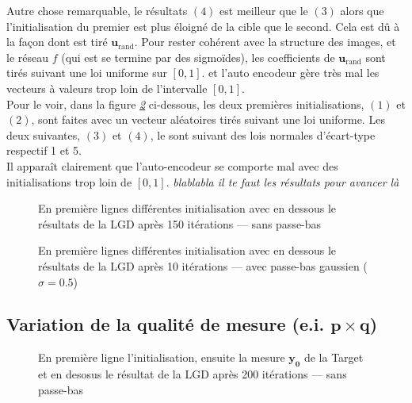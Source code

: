 \documentclass[hidelinks, french]{article} %
\renewcommand{\bf}[1]{\boldsymbol{#1}}
\theoremstyle{enonce}
\theoremstyle{special}
\theoremstyle{rq}
\theoremstyle{exo}
\theoremstyle{demo}
\begin{document}
Autre chose remarquable, le résultats $(4)$ est meilleur que le $(3)$ alors que l'initialisation du premier est plus éloigné de la cible que le second. Cela est dû à la façon dont est tiré $\bf{u}_{\text{rand}}$. Pour rester cohérent avec la structure des images, et le réseau $f$ (qui est se termine par des sigmoïdes), les coefficients de $\bf{u}_{\text{rand}}$ sont tirés suivant une loi uniforme sur $[0,1]$. et l'auto encodeur gère très mal les vecteurs à valeurs trop loin de l'intervalle $[0,1]$. 
\\

Pour le voir, dans la figure \textit{\ref{fig:LGDmultarg-g}} ci-dessous, les deux premières initialisations, $(1)$ et $(2)$, sont faites avec un vecteur aléatoires tirés suivant une loi uniforme. Les deux suivantes, $(3)$ et $(4)$, le sont suivant des lois normales d'écart-type respectif 1 et 5. 
\\
Il apparaît clairement que l'auto-encodeur se comporte mal avec des initialisations trop loin de $[0,1]$. \emph{blablabla il te faut les résultats pour avancer là}

\begin{figure}[H]\centering
    \caption{En première lignes différentes initialisation avec en dessous le résultats de la LGD après 150 itérations --- sans passe-bas}
    \label{fig:LGDmultarg-s}
\end{figure}
\begin{figure}[H]\centering
    \caption{En première lignes différentes initialisation avec en dessous le résultats de la LGD après 10 itérations ---  avec passe-bas gaussien ($\sigma=0.5$)}
    \label{fig:LGDmultarg-g}
\end{figure}







\subsection{Variation de la qualité de mesure (e.i. $\bf{p}\times\bf{q}$)}

\begin{figure}[H]\centering
	
	\caption{En première ligne l'initialisation, ensuite la mesure $\bf{y_0}$ de la Target et en desosus le résultat de la LGD après 200 itérations --- sans passe-bas}
	\label{fig:LGD comp_inits g}
\end{figure}
\end{document}
